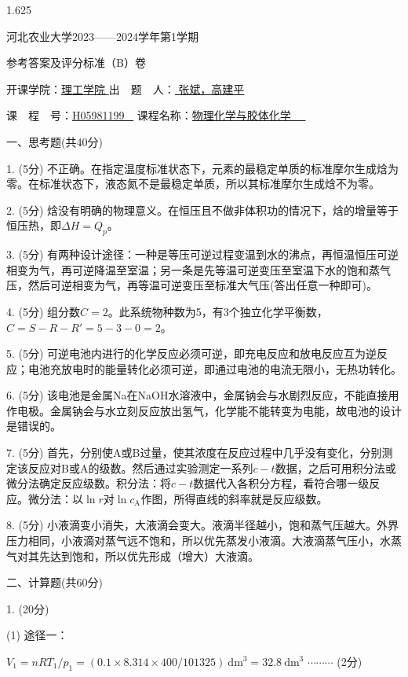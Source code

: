 \documentclass[12pt, b5paper]{article}
\begin{document}
\begin{spacing}{1.625}

\centerline{{\Large 河北农业大学2023——2024学年第1学期}}

\centerline{\Large 参考答案及评分标准（B）卷}

\centerline{开课学院：\underline{\quad 理工学院 \quad} \quad 出\ \ 题\ \ 人：\underline{  \qquad 张斌，高建平 \qquad}}

\centerline{课\ \ 程\ \ 号：\underline{\quad H05981199 \ } \quad 课程名称：\underline{\quad 物理化学与胶体化学 \ \ }}

\bigskip

一、思考题(共40分)

1. (5分) 不正确。在指定温度标准状态下，元素的最稳定单质的标准摩尔生成焓为零。在标准状态下，液态氮不是最稳定单质，所以其标准摩尔生成焓不为零。

2. (5分) 焓没有明确的物理意义。在恒压且不做非体积功的情况下，焓的增量等于恒压热，即$\Delta H=Q_p$。

3. (5分) 有两种设计途径：一种是等压可逆过程变温到水的沸点，再恒温恒压可逆相变为气，再可逆降温至室温；另一条是先等温可逆变压至室温下水的饱和蒸气压，然后可逆相变为气，再等温可逆变压至标准大气压(答出任意一种即可)。

4. (5分) 组分数$C=2$。此系统物种数为5，有3个独立化学平衡数，$C=S-R-R'=5-3-0=2$。

5. (5分) 可逆电池内进行的化学反应必须可逆，即充电反应和放电反应互为逆反应；电池充放电时的能量转化必须可逆，即通过电池的电流无限小，无热功转化。

6. (5分) 该电池是金属Na在NaOH水溶液中，金属钠会与水剧烈反应，不能直接用作电极。金属钠会与水立刻反应放出氢气，化学能不能转变为电能，故电池的设计是错误的。

7. (5分) 首先，分别使A或B过量，使其浓度在反应过程中几乎没有变化，分别测定该反应对B或A的级数。然后通过实验测定一系列$c-t$数据，之后可用积分法或微分法确定反应级数。积分法：将$c-t$数据代入各积分方程，看符合哪一级反应。微分法：以$\ln r$对$\ln c_\mathrm{A}$作图，所得直线的斜率就是反应级数。

8. (5分) 小液滴变小消失，大液滴会变大。液滴半径越小，饱和蒸气压越大。外界压力相同，小液滴对蒸气远不饱和，所以优先蒸发小液滴。大液滴蒸气压小，水蒸气对其先达到饱和，所以优先形成（增大）大液滴。

\bigskip

二、计算题(共60分)

1. (20分)

(1) 途径一：

$V_{1}=nRT_{1}/p_{1}=(0.1\times8.314\times400/101325)\ \mathrm{dm}^{3}=32.8\ \mathrm{dm}^{3}$ \hfill $\cdots \cdots \cdots$ (2分)


\end{spacing}
\end{document}
